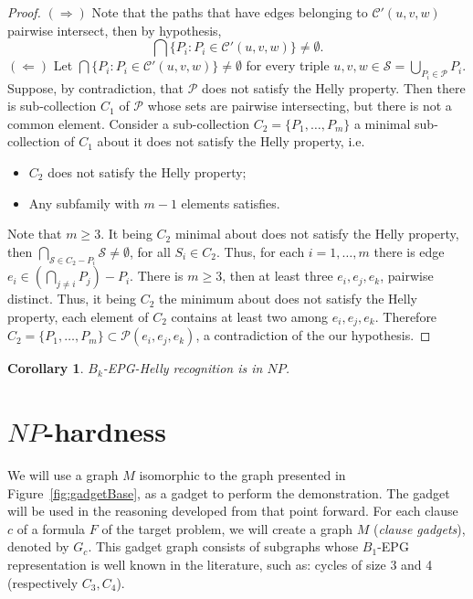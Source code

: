 \documentclass[a4paper,11pt]{article}
\newtheorem{coro}[theorem]{Corollary}
\begin{document}
\begin{proof}
$(\Rightarrow)$ Note that the paths that have edges belonging to $\mathcal{C'}(u, v, w)$ pairwise intersect, then by hypothesis,
$$\bigcap \{P_i: P_i	\in \mathcal{C'}(u,v,w)\} \neq \emptyset .$$
$(\Leftarrow)$ Let $\bigcap \{P_i: P_i	\in \mathcal{C'}(u,v,w)\} \neq \emptyset$  for every triple $ \displaystyle  u,v,w \in \mathcal{S} = \bigcup _{P_i \in \mathcal{P}} P_i$.
Suppose, by contradiction, that $\mathcal{P}$ does not satisfy the Helly property. Then there is sub-collection $C_1$ of $ \mathcal{P}$ whose sets are pairwise intersecting, but there is not a common element. Consider a sub-collection $C_2 = \{P_1, \dots, P_m\}$ a minimal sub-collection of $C_1$ about  it does not satisfy the Helly property, i.e.
\begin{itemize}
\item $C_2$ does not satisfy the Helly property;
\item Any subfamily with $m-1$ elements satisfies.
\end{itemize}
Note that $m\geq 3$. It being $C_2$ minimal about does not satisfy the Helly property, then $\bigcap _{ \mathcal{S} \in C_2-P_i	} \mathcal{S} \neq \emptyset$, for all $S_i \in C_2$. Thus,  for each $i=1, \dots, m$ there is edge $e_i \in (\bigcap _{j\neq i}P_j)-P_i$.
There is $m\geq 3$, then at least three $e_i, e_j, e_k$, pairwise distinct. Thus, it being $C_2$ the minimum about does not satisfy the Helly property, each element of $C_2$ contains at least two among $e_i, e_j, e_k$.  Therefore $C_2 = \{P_1, \dots, P_m\} \subset \mathcal{P}(e_i, e_j, e_k)$, a contradiction of the our hypothesis.
\end{proof}


\begin{coro}
{\sc $B_k$-EPG-Helly  recognition} is in $NP$.
\end{coro}
 



\section{$NP$-hardness}\label{sec:sectionDispositivoClausula}

We will use a graph $M$ isomorphic to the graph presented in Figure~\ref{fig:gadgetBase}, as a gadget to perform the demonstration. The gadget will be used in the reasoning developed from that point forward. For each  clause $c$ of a formula $F$ of the target problem, we will create a  graph $M$ (\emph{clause gadgets}), denoted by $G_c$. This gadget graph consists of subgraphs whose $B_1$-EPG representation is well known in the literature, such as: cycles of size 3 and 4 (respectively $ C_3, C_4 $).
\end{document}
